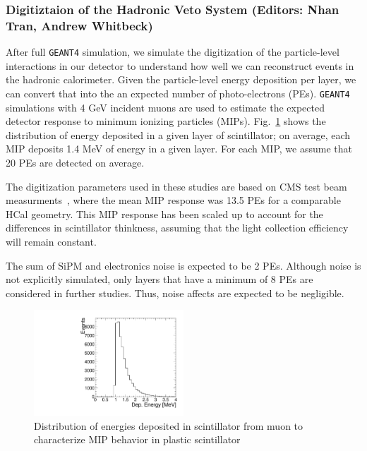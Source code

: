 \subsubsection{Digitiztaion of the Hadronic Veto System (Editors: Nhan Tran, Andrew Whitbeck)}
\label{sec:hcaldig}

After full {\tt GEANT4} simulation, we simulate the digitization of the particle-level interactions in our detector to 
understand how well we can reconstruct events in the hadronic calorimeter.  Given the particle-level energy 
deposition per layer, we can convert that into the an expected number of photo-electrons (PEs).   
{\tt GEANT4} simulations with 4 GeV incident muons are used to estimate the expected detector response to minimum ionizing particles (MIPs).  Fig.~\ref{fig:hcalMIP} shows the distribution of energy deposited in a given layer of scintillator; on
average, each MIP deposits 1.4 MeV of energy in a given layer.   For each MIP, we assume that 20 PEs are detected
on average.

The digitization parameters used in these studies are based on CMS test beam measurments~\cite{}, where 
the mean MIP response was 13.5 PEs for a comparable HCal geometry.  This MIP response has been scaled up to
account for the differences in scintillator thinkness, assuming that the light collection efficiency will remain constant.

The sum of SiPM and electronics noise is expected to be 2 PEs.  Although noise is not explicitly simulated, only layers
that have a minimum of 8 PEs are considered in further studies.   Thus, noise affects are expected to be negligible.  



\begin{figure}[hbtp]
\begin{center}
    \includegraphics[width=0.5\textwidth]{images/hcal/MIPresponse0degreesOnly.pdf}
    \caption{Distribution of energies deposited in scintillator from muon to characterize MIP behavior in plastic scintillator}
 \label{fig:hcalMIP}
 \end{center}
\end{figure}
